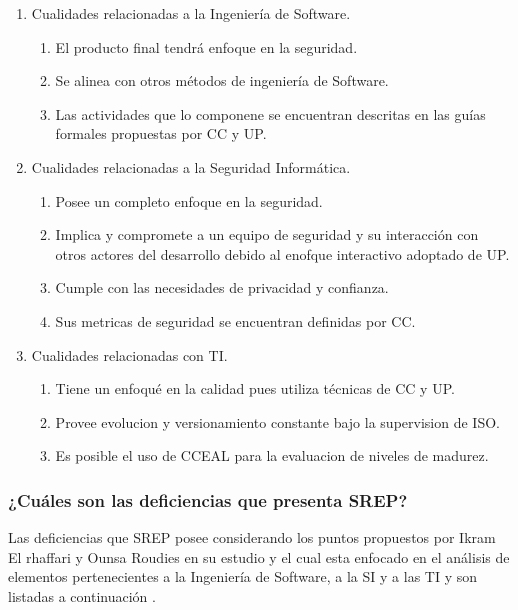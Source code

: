 \documentclass[runningheads,a4paper]{llncs}
\begin{document}
\begin{enumerate}
	\item Cualidades relacionadas a la Ingeniería de \gls{Software}.
		\begin{enumerate}
			\item El producto final tendrá enfoque en la seguridad.
			\item Se alinea con otros métodos de ingeniería de \gls{Software}.
			\item Las actividades que lo componene se encuentran descritas en las guías formales propuestas por \gls{CC} y \gls{UP}.\\
			
		\end{enumerate}
	\item Cualidades relacionadas a la Seguridad Informática.
		\begin{enumerate}
			\item Posee un completo enfoque en la seguridad.
			\item Implica y compromete a un equipo de seguridad y su interacción con otros actores del desarrollo debido al enofque interactivo adoptado de \gls{UP}.
			\item Cumple con las necesidades de privacidad y confianza.
			\item Sus metricas de seguridad se encuentran definidas por \gls{CC}.\\

		\end{enumerate}
	\item Cualidades relacionadas con \gls{TI}.
		\begin{enumerate}
			\item Tiene un enfoqué en la calidad pues utiliza técnicas de \gls{CC} y \gls{UP}. 
			\item Provee evolucion y versionamiento constante bajo la supervision de \gls{ISO}.
			\item Es posible el uso de \gls{CCEAL} para la evaluacion de niveles de madurez.
		\end{enumerate}
\end{enumerate}

\subsubsection{¿Cuáles son las deficiencias que presenta \gls{SREP}?}
Las deficiencias que \gls{SREP} posee considerando los puntos propuestos por Ikram El rhaffari y Ounsa Roudies en su estudio y el cual esta enfocado en el análisis de elementos pertenecientes a la Ingeniería de \gls{Software}, a la \gls{SI} y a las \gls{TI} y son listadas a continuación \cite{BenchmarkingSDLCLAPS}.
\end{document}
